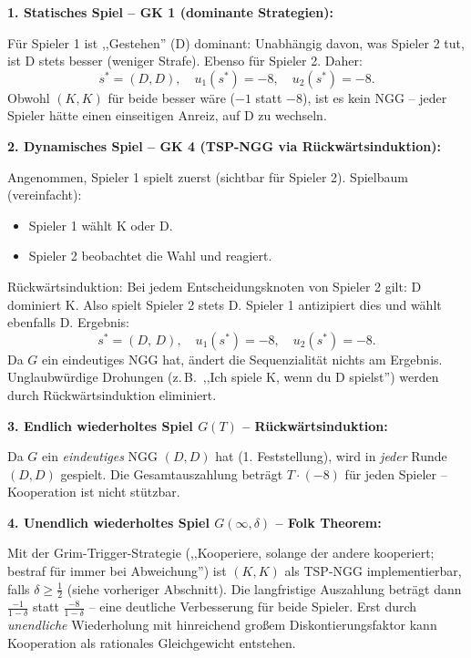 \medskip
\textbf{1. Statisches Spiel -- GK 1 (dominante Strategien):}

Für Spieler 1 ist ,,Gestehen'' (D) dominant: Unabhängig davon, was Spieler 2 tut, ist D stets besser (weniger Strafe). Ebenso für Spieler 2. Daher:
\[
s^* = (D, D), \quad u_1(s^*) = -8, \quad u_2(s^*) = -8.
\]
Obwohl $(K,K)$ für beide besser wäre ($-1$ statt $-8$), ist es kein NGG -- jeder Spieler hätte einen einseitigen Anreiz, auf D zu wechseln.

\medskip
\textbf{2. Dynamisches Spiel -- GK 4 (TSP-NGG via Rückwärtsinduktion):}

Angenommen, Spieler 1 spielt zuerst (sichtbar für Spieler 2). Spielbaum (vereinfacht):
\begin{itemize}[leftmargin=1.5em]
    \item Spieler 1 wählt K oder D.
    \item Spieler 2 beobachtet die Wahl und reagiert.
\end{itemize}
Rückwärtsinduktion: Bei jedem Entscheidungsknoten von Spieler 2 gilt: D dominiert K. Also spielt Spieler 2 stets D. Spieler 1 antizipiert dies und wählt ebenfalls D. Ergebnis:
\[
s^* = (D,\, D), \quad u_1(s^*) = -8, \quad u_2(s^*) = -8.
\]
Da $G$ ein eindeutiges NGG hat, ändert die Sequenzialität nichts am Ergebnis. Unglaubwürdige Drohungen (z.\,B.\ ,,Ich spiele K, wenn du D spielst'') werden durch Rückwärtsinduktion eliminiert.

\medskip
\textbf{3. Endlich wiederholtes Spiel $G(T)$ -- Rückwärtsinduktion:}

Da $G$ ein \emph{eindeutiges} NGG $(D,D)$ hat (1. Feststellung), wird in \emph{jeder} Runde $(D,D)$ gespielt. Die Gesamtauszahlung beträgt $T \cdot (-8)$ für jeden Spieler -- Kooperation ist nicht stützbar.

\medskip
\textbf{4. Unendlich wiederholtes Spiel $G(\infty,\delta)$ -- Folk Theorem:}

Mit der Grim-Trigger-Strategie (,,Kooperiere, solange der andere kooperiert; bestraf für immer bei Abweichung'') ist $(K,K)$ als TSP-NGG implementierbar, falls $\delta \geq \tfrac{1}{2}$ (siehe vorheriger Abschnitt). Die langfristige Auszahlung beträgt dann $\tfrac{-1}{1-\delta}$ statt $\tfrac{-8}{1-\delta}$ -- eine deutliche Verbesserung für beide Spieler. Erst durch \emph{unendliche} Wiederholung mit hinreichend großem Diskontierungsfaktor kann Kooperation als rationales Gleichgewicht entstehen.

\newpage